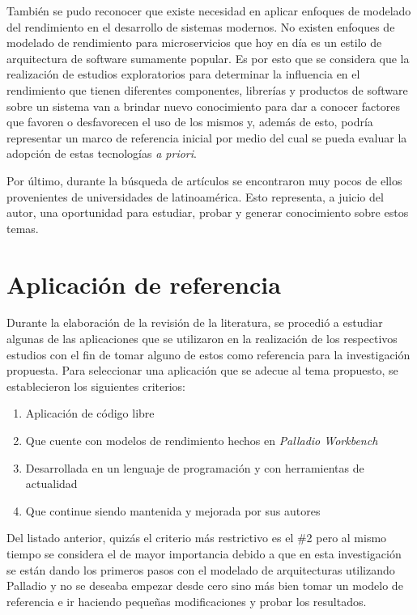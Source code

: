 \documentclass[11pt, twoside]{report}
\begin{document}
También se pudo reconocer que existe necesidad en aplicar enfoques de modelado del rendimiento en el desarrollo de sistemas modernos. No existen enfoques de modelado de rendimiento para microservicios que hoy en día es un estilo de arquitectura de software sumamente popular. Es por esto que se considera que la realización de estudios exploratorios para determinar la influencia en el rendimiento que tienen diferentes componentes, librerías y productos de software sobre un sistema van a brindar nuevo conocimiento para dar a conocer factores que favoren o desfavorecen el uso de los mismos y, además de esto, podría representar un marco de referencia inicial por medio del cual se pueda evaluar la adopción de estas tecnologías \emph{a priori}. 

Por último, durante la búsqueda de artículos se encontraron muy pocos de ellos provenientes de universidades de latinoamérica. Esto representa, a juicio del autor, una oportunidad para estudiar, probar y generar conocimiento sobre estos temas.  

\newpage
\section{Aplicación de referencia} \label{ch:aplicacion-referencia}

Durante la elaboración de la revisión de la literatura, se procedió a estudiar algunas de las aplicaciones que se utilizaron en la realización de los respectivos estudios con el fin de tomar alguno de estos como referencia para la investigación propuesta. Para seleccionar una aplicación que se adecue al tema propuesto, se establecieron los siguientes criterios:
\begin{enumerate}
    \item Aplicación de código libre
    \item Que cuente con modelos de rendimiento hechos en \emph{Palladio Workbench}
    \item Desarrollada en un lenguaje de programación y con herramientas de actualidad
    \item Que continue siendo mantenida y mejorada por sus autores
\end{enumerate}


Del listado anterior, quizás el criterio más restrictivo es el \#2 pero al mismo tiempo se considera el de mayor importancia debido a que en esta investigación se están dando los primeros pasos con el modelado de arquitecturas utilizando Palladio y no se deseaba empezar desde cero sino más bien tomar un modelo de referencia e ir haciendo pequeñas modificaciones y probar los resultados.
\end{document}
